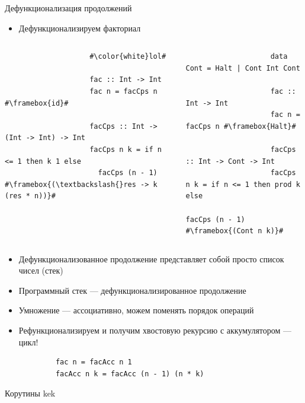     \begin{frame}[fragile]{Дефункционализация продолжений}
        \begin{itemize}
            \item Дефункционализируем факториал
        \end{itemize}
        \vspace{-3em}
        \begin{columns}[onlytextwidth]
            \begin{column}[t]{0.485\textwidth}
                \begin{verbatim}
                    #\color{white}lol#

                    fac :: Int -> Int
                    fac n = facCps n #\framebox{id}#

                    facCps :: Int -> (Int -> Int) -> Int
                    facCps n k = if n <= 1 then k 1 else
                      facCps (n - 1) #\framebox{(\textbackslash{}res -> k (res * n))}#
                \end{verbatim}
            \end{column}\hfill%
            \begin{column}[t]{0.485\textwidth}
                \begin{verbatim}
                    data Cont = Halt | Cont Int Cont

                    fac :: Int -> Int
                    fac n = facCps n #\framebox{Halt}#

                    facCps :: Int -> Cont -> Int
                    facCps n k = if n <= 1 then prod k else
                      facCps (n - 1) #\framebox{(Cont n k)}#
                \end{verbatim}
            \end{column}
        \end{columns}
        \vspace{1em}
        \begin{itemize}
            \item \pause Дефункционализованное продолжение представляет собой просто список чисел (стек)
            \item Программный стек --- дефункционализированное продолжение
            \item \pause Умножение --- ассоциативно, можем поменять порядок операций
            \item Рефункционализируем и получим хвостовую рекурсию с аккумулятором --- цикл!
        \end{itemize}
        \vspace{0.5em}
        \begin{verbatim}
            fac n = facAcc n 1
            facAcc n k = facAcc (n - 1) (n * k)
        \end{verbatim}
    \end{frame}

    \begin{frame}[fragile]{Корутины}
        kek
    \end{frame}







